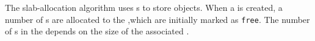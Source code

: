 The slab-allocation algorithm uses s to store  objects.
When a  is created, a number of s are allocated to the ,which are initially marked as \texttt{free}.
The number of s in the  depends on the size of the associated .



